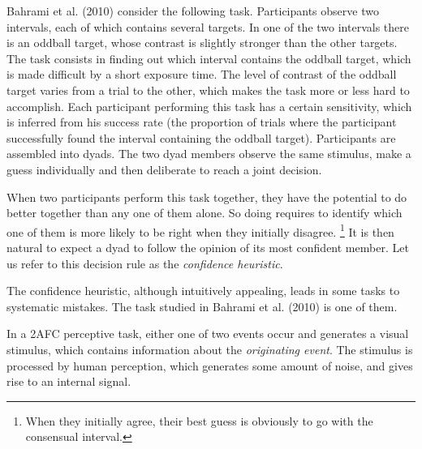 \documentclass[12pt]{report}
\begin{document}



Bahrami et al. (2010) consider the following task. Participants observe two intervals, each of which contains several targets. In one of the two intervals there is an oddball target, whose contrast is slightly stronger than the other targets. The task consists in finding out which interval contains the oddball target, which is made difficult by a short exposure time. The level of contrast of the oddball target varies from a trial to the other, which makes the task more or less hard to accomplish. Each participant performing this task has a certain sensitivity, which is inferred from his success rate (the proportion of trials where the participant successfully found the interval containing the oddball target). Participants are assembled into dyads. The two dyad members observe the same stimulus, make a guess individually and then deliberate to reach a joint decision. 

When two participants perform this task together, they have the potential to do better together than any one of them alone. So doing requires to identify which one of them is more likely to be right when they initially disagree. \footnote{When they initially agree, their best guess is obviously to go with the consensual interval.} It is then natural to expect a dyad to follow the opinion of its most confident member. Let us refer to this decision rule as the \textit{confidence heuristic}.

The confidence heuristic, although intuitively appealing, leads in some tasks to systematic mistakes. The task studied in Bahrami et al. (2010) is one of them. 

In a 2AFC perceptive task, either one of two events occur and generates a visual stimulus, which contains information about the \textit{originating event}. The stimulus is processed by human perception, which generates some amount of noise, and gives rise to an internal signal.
\end{document}
